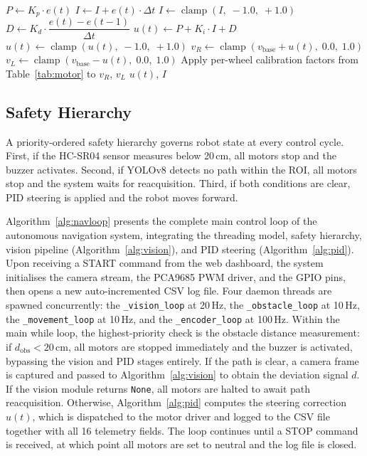 \begin{algorithm}[H]
\DontPrintSemicolon
\caption{Discrete-Time PID Steering Controller with Anti-Windup}
\label{alg:pid}
\BlankLine
$P \leftarrow K_p \cdot e(t)$ 
$I \leftarrow I + e(t)\cdot\Delta t$\;
$I \leftarrow \operatorname{clamp}(I,\;{-}1.0,\;{+}1.0)$ 
$D \leftarrow K_d\cdot\dfrac{e(t)-e(t{-}1)}{\Delta t}$ 
$u(t) \leftarrow P + K_i\cdot I + D$\;
$u(t) \leftarrow \operatorname{clamp}(u(t),\;{-}1.0,\;{+}1.0)$\;
\BlankLine
{}
$v_R \leftarrow \operatorname{clamp}(v_{\text{base}}+u(t),\;0.0,\;1.0)$\;
$v_L \leftarrow \operatorname{clamp}(v_{\text{base}}-u(t),\;0.0,\;1.0)$\;
Apply per-wheel calibration factors from Table~\ref{tab:motor} to $v_R$, $v_L$\;
\Return $u(t)$, $I$\;
\end{algorithm}

\subsection{Safety Hierarchy}

A priority-ordered safety hierarchy governs robot state at every
control cycle. First, if the HC-SR04 sensor measures below 20\,cm,
all motors stop and the buzzer activates. Second, if YOLOv8 detects
no path within the ROI, all motors stop and the system waits for
reacquisition. Third, if both conditions are clear, PID steering is
applied and the robot moves forward.

Algorithm~\ref{alg:navloop} presents the complete main control loop of the autonomous navigation system, integrating the threading model, safety hierarchy, vision pipeline (Algorithm~\ref{alg:vision}), and PID steering (Algorithm~\ref{alg:pid}). Upon receiving a START command from the web dashboard, the system initialises the camera stream, the PCA9685 PWM driver, and the GPIO pins, then opens a new auto-incremented CSV log file. Four daemon threads are spawned concurrently: the \texttt{\_vision\_loop} at 20\,Hz, the \texttt{\_obstacle\_loop} at 10\,Hz, the \texttt{\_movement\_loop} at 10\,Hz, and the \texttt{\_encoder\_loop} at 100\,Hz. Within the main while loop, the highest-priority check is the obstacle distance measurement: if $d_{\text{obs}} < 20$\,cm, all motors are stopped immediately and the buzzer is activated, bypassing the vision and PID stages entirely. If the path is clear, a camera frame is captured and passed to Algorithm~\ref{alg:vision} to obtain the deviation signal $d$. If the vision module returns \texttt{None}, all motors are halted to await path reacquisition. Otherwise, Algorithm~\ref{alg:pid} computes the steering correction $u(t)$, which is dispatched to the motor driver and logged to the CSV file together with all 16 telemetry fields. The loop continues until a STOP command is received, at which point all motors are set to neutral and the log file is closed.

